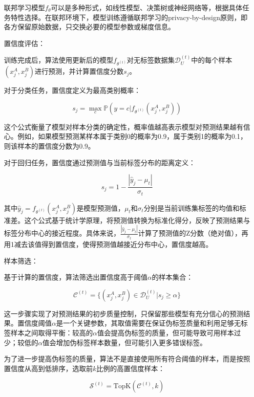 联邦学习模型$f_\theta$可以是多种形式，如线性模型、决策树或神经网络等，根据具体任务特性选择。在联邦环境下，模型训练遵循联邦学习的privacy-by-design原则，即各方保留原始数据，只交换必要的模型参数或梯度信息。

置信度评估：

训练完成后，算法使用更新后的模型$f_{\theta^{(t)}}$对无标签数据集$\mathcal{D}_U^{(t)}$中的每个样本$(x^A_j,x^B_j)$进行预测，并计算置信度分数$s_j$。

对于分类任务，置信度定义为最高类别概率：

\begin{equation}
	s_j = \max_{c} \mathbb{P}(y=c|f_{\theta^{(t)}}(x^A_j,x^B_j))
\end{equation}

这个公式衡量了模型对样本分类的确定性，概率值越高表示模型对预测结果越有信心。例如，如果模型预测某样本属于类别0的概率为0.9，属于类别1的概率为0.1，则该样本的置信度分数为0.9。

对于回归任务，置信度通过预测值与当前标签分布的距离定义：

\begin{equation}
	s_j = 1 - \frac{|\hat{y}_j - \mu_t|}{\sigma_t}
\end{equation}

其中$\hat{y}_j = f_{\theta^{(t)}}(x^A_j,x^B_j)$是模型预测值，$\mu_t$和$\sigma_t$分别是当前训练集标签的均值和标准差。这个公式基于统计学原理，将预测值转换为标准化得分，反映了预测结果与标签分布中心的接近程度。具体来说，$\frac{|\hat{y}_j - \mu_t|}{\sigma_t}$计算了预测值的Z分数（绝对值），再用1减去该值得到置信度，使得预测值越接近分布中心，置信度越高。

样本筛选：

基于计算的置信度，算法筛选出置信度高于阈值$\alpha$的样本集合：

\begin{equation}
	\mathcal{C}^{(t)} = \{(x^A_j,x^B_j) \in \mathcal{D}_U^{(t)} | s_j \geq \alpha\}
\end{equation}

这一步骤实现了对预测结果的初步质量控制，只保留那些模型有充分信心的预测结果。置信度阈值$\alpha$是一个关键参数，其取值需要在保证伪标签质量和利用足够无标签样本之间取得平衡：较高的$\alpha$值会提高伪标签的质量，但可能导致可用样本过少；较低的$\alpha$值会增加伪标签样本数量，但可能引入更多错误标签。

为了进一步提高伪标签的质量，算法不是直接使用所有符合阈值的样本，而是按照置信度从高到低排序，选取前$k$比例的高置信度样本：

\begin{equation}
	\mathcal{S}^{(t)} = \text{TopK}(\mathcal{C}^{(t)}, k)
\end{equation}

